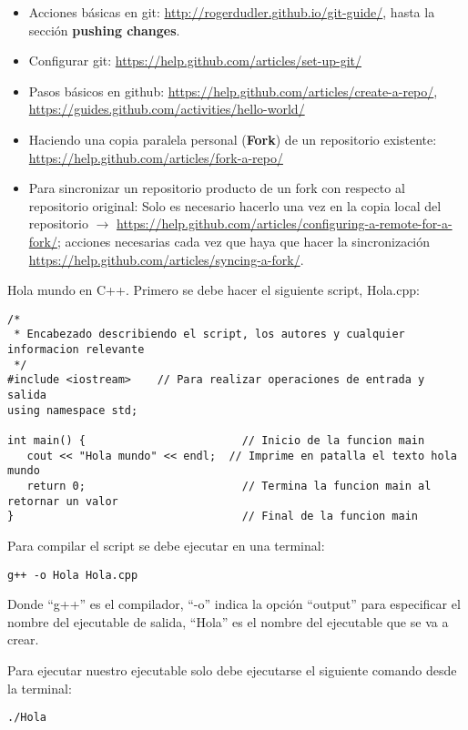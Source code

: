 \documentclass[10.5pt]{article}
\begin{document}
\begin{itemize}
\item Acciones básicas en git: \url{http://rogerdudler.github.io/git-guide/}, hasta la sección {\textbf{pushing changes}}.
\item Configurar git: \url{https://help.github.com/articles/set-up-git/}
\item Pasos básicos en github: \url{https://help.github.com/articles/create-a-repo/}, \url{https://guides.github.com/activities/hello-world/}
\item Haciendo una copia paralela personal ({\textbf{Fork}}) de un repositorio existente: \url{https://help.github.com/articles/fork-a-repo/}
\item Para sincronizar un repositorio producto de un fork con respecto al repositorio original: Solo es necesario hacerlo una vez en la copia local del repositorio $\rightarrow$ \url{https://help.github.com/articles/configuring-a-remote-for-a-fork/}; acciones necesarias cada vez que haya que hacer la sincronización \url{https://help.github.com/articles/syncing-a-fork/}.
\end{itemize}

Hola mundo en C++. Primero se debe hacer el siguiente script, Hola.cpp:
\begin{verbatim}
/*
 * Encabezado describiendo el script, los autores y cualquier informacion relevante
 */
#include <iostream>    // Para realizar operaciones de entrada y salida
using namespace std;
 
int main() {                        // Inicio de la funcion main
   cout << "Hola mundo" << endl;  // Imprime en patalla el texto hola mundo
   return 0;                        // Termina la funcion main al retornar un valor
}                                   // Final de la funcion main
\end{verbatim}

Para compilar el script se debe ejecutar en una terminal:
\begin{verbatim}
g++ -o Hola Hola.cpp
\end{verbatim}

Donde ``g++'' es el compilador, ``-o'' indica la opción ``output'' para especificar el nombre del ejecutable de salida, ``Hola'' es el nombre del ejecutable que se va a crear.

Para ejecutar nuestro ejecutable solo debe ejecutarse el siguiente comando desde la terminal:
\begin{verbatim}
./Hola
\end{verbatim}
\end{document}
